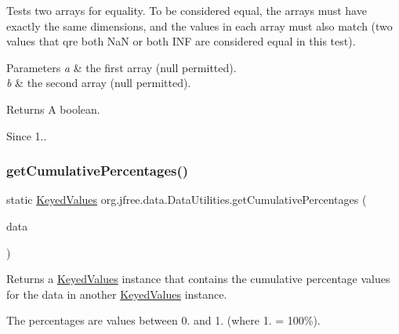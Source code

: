 Tests two arrays for equality. To be considered equal, the arrays must have exactly the same dimensions, and the values in each array must also match (two values that qre both NaN or both I\+NF are considered equal in this test).


\begin{DoxyParams}{Parameters}
{\em a} & the first array ({\ttfamily null} permitted). \\
\hline
{\em b} & the second array ({\ttfamily null} permitted).\\
\hline
\end{DoxyParams}
\begin{DoxyReturn}{Returns}
A boolean.
\end{DoxyReturn}
\begin{DoxySince}{Since}
1.. 
\end{DoxySince}
\mbox{\label{classorg_1_1jfree_1_1data_1_1_data_utilities_a3bf86eb46d89fd20980836bf9e5f4704}} 
\subsubsection{\texorpdfstring{get\+Cumulative\+Percentages()}{getCumulativePercentages()}}
{\footnotesize\ttfamily static \mbox{\hyperlink{interfaceorg_1_1jfree_1_1data_1_1_keyed_values}{Keyed\+Values}} org.\+jfree.\+data.\+Data\+Utilities.\+get\+Cumulative\+Percentages (\begin{DoxyParamCaption}\item[{\mbox{\hyperlink{interfaceorg_1_1jfree_1_1data_1_1_keyed_values}{Keyed\+Values}}}]{data }\end{DoxyParamCaption})\hspace{0.3cm}{\ttfamily [static]}}

Returns a \mbox{\hyperlink{interfaceorg_1_1jfree_1_1data_1_1_keyed_values}{Keyed\+Values}} instance that contains the cumulative percentage values for the data in another \mbox{\hyperlink{interfaceorg_1_1jfree_1_1data_1_1_keyed_values}{Keyed\+Values}} instance. 

The percentages are values between 0. and 1. (where 1. = 100\%).


